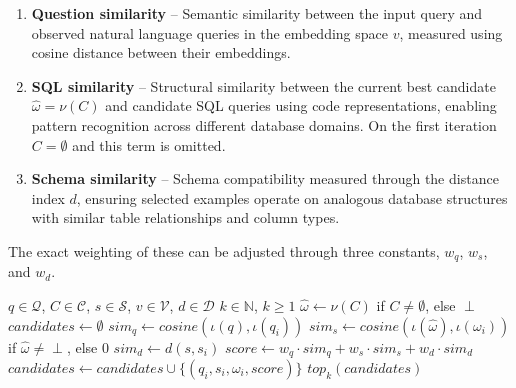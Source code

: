 \begin{enumerate}
    \item \textbf{Question similarity} – Semantic similarity between the input
        query and observed natural language queries in the embedding space
        $v$, measured using cosine distance between their embeddings.
    \item \textbf{SQL similarity} – Structural similarity between the current
        best candidate $\hat{\omega} = \nu(C)$ and candidate SQL queries using
        code representations, enabling pattern recognition across different
        database domains. On the first iteration $C = \emptyset$ and this term
        is omitted.
    \item \textbf{Schema similarity} – Schema compatibility measured through
        the distance index $d$, ensuring selected examples operate on analogous
        database structures with similar table relationships and column types.
\end{enumerate}

The exact weighting of these can be adjusted through three constants, $w_q$, $w_s$, and $w_d$.

\begin{algorithm}
\caption{$\sigma$ - Example Selection}\label{algorithms:sigma}
\begin{algorithmic}[1]
\Require $q \in \mathcal{Q}$, $C \in \mathcal{C}$, $s \in \mathcal{S}$, $v \in \mathcal{V}$, $d \in \mathcal{D}$
\Require $k \in \mathbb{N}$, $k \geq 1$                            
\State $\hat{\omega} \gets \nu(C)$ if $C \neq \emptyset$, else $\perp$ 
\State $candidates  \gets \emptyset$                               
                                 
    \State $sim_q \gets cosine(\iota(q), \iota(q_i))$              
    \State $sim_s \gets cosine(\iota(\hat{\omega}), \iota(\omega_i))$ if $\hat{\omega} \neq \perp$, else $0$ 
    \State $sim_d \gets d(s, s_i)$                                 
    \State $score \gets w_q \cdot sim_q + w_s \cdot sim_s + w_d \cdot sim_d$
    \State $candidates \gets candidates \cup \{(q_i, s_i, \omega_i, score)\}$
\EndFor
\State \Return $top_{k}(candidates)$                               
\end{algorithmic}
\end{algorithm}

